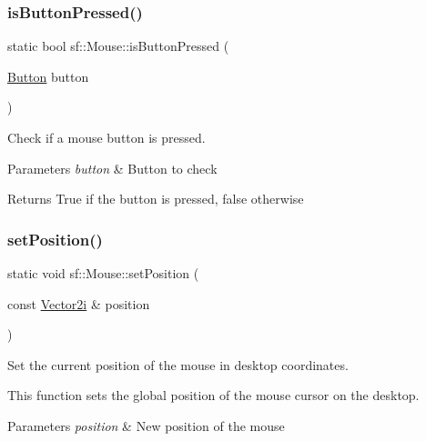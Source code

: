 \subsubsection{\texorpdfstring{isButtonPressed()}{isButtonPressed()}}
{\footnotesize\ttfamily static bool sf\+::\+Mouse\+::is\+Button\+Pressed (\begin{DoxyParamCaption}\item[{\mbox{\hyperlink{classsf_1_1_mouse_a4fb128be433f9aafe66bc0c605daaa90}{Button}}}]{button }\end{DoxyParamCaption})\hspace{0.3cm}{\ttfamily [static]}}



Check if a mouse button is pressed. 


\begin{DoxyParams}{Parameters}
{\em button} & Button to check\\
\hline
\end{DoxyParams}
\begin{DoxyReturn}{Returns}
True if the button is pressed, false otherwise \begin{DoxyVerb}\end{DoxyVerb}
 
\end{DoxyReturn}
\mbox{\label{classsf_1_1_mouse_a1222e16c583be9e3d176d86e0b7817d7}} 
\subsubsection{\texorpdfstring{setPosition()}{setPosition()}\hspace{0.1cm}{\footnotesize\ttfamily [1/2]}}
{\footnotesize\ttfamily static void sf\+::\+Mouse\+::set\+Position (\begin{DoxyParamCaption}\item[{const \mbox{\hyperlink{classsf_1_1_vector2}{Vector2i}} \&}]{position }\end{DoxyParamCaption})\hspace{0.3cm}{\ttfamily [static]}}



Set the current position of the mouse in desktop coordinates. 

This function sets the global position of the mouse cursor on the desktop.


\begin{DoxyParams}{Parameters}
{\em position} & New position of the mouse \begin{DoxyVerb}\end{DoxyVerb}
 \\
\hline
\end{DoxyParams}
\mbox{\label{classsf_1_1_mouse_ad9b16ec7041531315f06b26b413dfea8}} 
